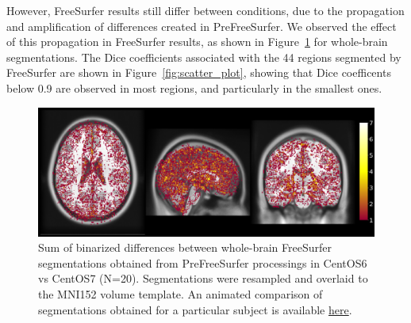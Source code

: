 \documentclass[a4paper,num-refs]{oup-contemporary}
\begin{document}
However, FreeSurfer results still differ between conditions, due to the
propagation and amplification of differences created in PreFreeSurfer. We
observed the effect of this propagation in FreeSurfer results, as shown in
Figure~\ref{fig:tissue_class} for whole-brain segmentations. The
Dice coefficients associated with the 44 regions segmented by
FreeSurfer are shown in Figure~\ref{fig:scatter_plot}, showing that Dice coefficents below 0.9 are 
observed in most regions, and particularly in the smallest ones.
\begin{figure}
\centering
  \includegraphics[width=\columnwidth]{figures/brain_segmentation_mni.png} 
  \caption{Sum of binarized differences between whole-brain FreeSurfer
  segmentations obtained from PreFreeSurfer processings in CentOS6 vs CentOS7
   (N=20). Segmentations were resampled and overlaid to the MNI152 volume
  template. An animated comparison of segmentations obtained for a particular subject is available
\href{https://github.com/big-data-lab-team/HCP-reproducibility-paper/blob/master/figures/fs_brain_segmentation.gif}
{here}.
} 
  \label{fig:tissue_class}
\end{figure}
\end{document}

